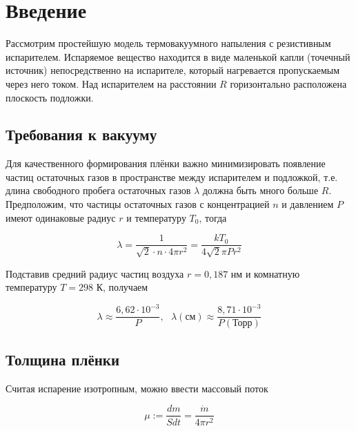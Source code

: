 \documentclass[a4paper, 14pt]{extarticle}
\begin{document}
	\section{Введение}
	
	\hspace{5mm} Рассмотрим простейшую модель термовакуумного напыления с резистивным испарителем. Испаряемое вещество находится в виде маленькой капли (точечный источник) непосредственно на испарителе, который нагревается пропускаемым через него током. Над испарителем на расстоянии $R$ горизонтально расположена плоскость подложки.
	
	\subsection{Требования к вакууму}
	
	\hspace{5mm} Для качественного формирования плёнки важно минимизировать появление частиц остаточных газов в пространстве между испарителем и подложкой, т.е. длина свободного пробега остаточных газов $\lambda$ должна быть много больше $R$. Предположим, что частицы остаточных газов с концентрацией $n$ и давлением $P$ имеют одинаковые радиус $r$ и температуру $T_0$, тогда
	
	\begin{equation}
		\lambda = \frac{1}{\sqrt{2}\cdot n\cdot 4\pi r^2} = \frac{kT_0}{4\sqrt{2}\pi P r^2}
	\end{equation}	
	
	Подставив средний радиус частиц воздуха $r = 0,187$ нм и комнатную температуру $T= 298$ К, получаем
	
	\begin{equation}
		\lambda \approx \frac{6,62\cdot 10^{-3}}{P}, \ \ \ \lambda(\text{см}) \approx \frac{8,71\cdot 10^{-3}}{P(\text{Торр})}
	\end{equation}	
	
	
	
	\subsection{Толщина плёнки}
	
	\hspace{5mm} Считая испарение изотропным, можно ввести массовый поток 
	
	\begin{equation}
		\mu := \frac{dm}{Sdt} = \frac{\dot{m}}{4\pi r^2}
	\end{equation} 
	
\end{document}
